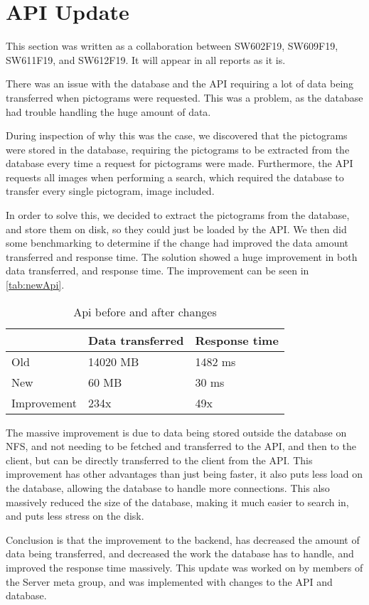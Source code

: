\section{API Update}\label{CollabAPIUpdate}
This section was written as a collaboration between SW602F19, SW609F19, SW611F19, and SW612F19.
It will appear in all reports as it is.

There was an issue with the database and the API requiring a lot of data being transferred when pictograms were requested. 
This was a problem, as the database had trouble handling the huge amount of data. 

During inspection of why this was the case, we discovered that the pictograms were stored in the database, requiring the pictograms to be extracted from the database every time a request for pictograms were made. 
Furthermore, the API requests all images when performing a search, which required the database to transfer every single pictogram, image included.

In order to solve this, we decided to extract the pictograms from the database, and store them on disk, so they could just be loaded by the API. 
We then did some benchmarking to determine if the change had improved the data amount transferred and response time. 
The solution showed a huge improvement in both data transferred, and response time. 
The improvement can be seen in \autoref{tab:newApi}.

\begin{table}[H]
    \centering
    \begin{tabular}{|l|l|l|}
    \hline
                    & Data transferred  & Response time \\ \hline
        Old         & 14020 MB          & 1482 ms       \\ \hline 
        New         & 60 MB             & 30 ms         \\ \hline
        Improvement & 234x              & 49x           \\ \hline
    \end{tabular}
    \caption{Api before and after changes}
    \label{tab:newApi}
\end{table}

The massive improvement is due to data being stored outside the database on NFS, and not needing to be fetched and transferred to the API, and then to the client, but can be directly transferred to the client from the API. 
This improvement has other advantages than just being faster, it also puts less load on the database, allowing the database to handle more connections. 
This also massively reduced the size of the database, making it much easier to search in, and puts less stress on the disk.

Conclusion is that the improvement to the backend, has decreased the amount of data being transferred, and decreased the work the database has to handle, and improved the response time massively. 
This update was worked on by members of the Server meta group, and was implemented with changes to the API and database. 
